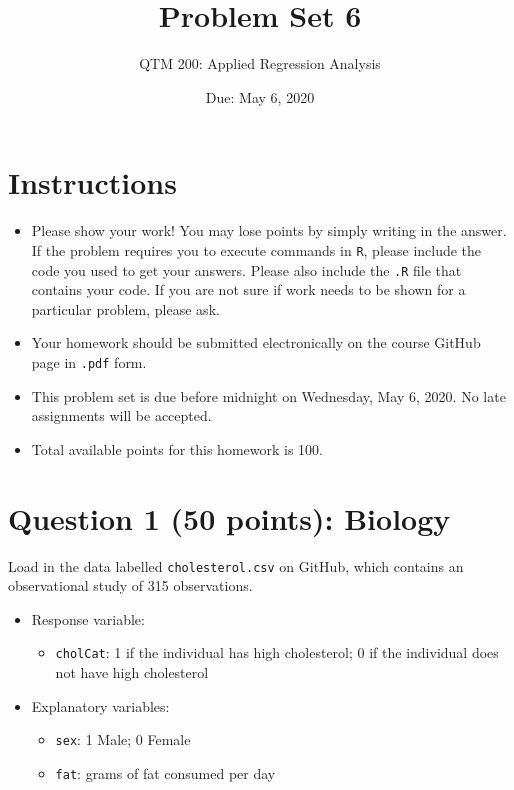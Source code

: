\documentclass[12pt,letterpaper]{article}
\title{Problem Set 6}
\date{Due: May 6, 2020}
\author{QTM 200: Applied Regression Analysis}
\begin{document}
	\maketitle
	
	\section*{Instructions}
	\begin{itemize}
		\item Please show your work! You may lose points by simply writing in the answer. If the problem requires you to execute commands in \texttt{R}, please include the code you used to get your answers. Please also include the \texttt{.R} file that contains your code. If you are not sure if work needs to be shown for a particular problem, please ask.
		\item Your homework should be submitted electronically on the course GitHub page in \texttt{.pdf} form.
		\item This problem set is due before midnight on Wednesday, May 6, 2020. No late assignments will be accepted.
		\item Total available points for this homework is 100.
	\end{itemize}
	
	\vspace{.5cm}
	\section*{Question 1 (50 points): Biology}
	\vspace{.25cm}
	\noindent Load in the data labelled \texttt{cholesterol.csv} on GitHub, which contains an observational study of 315 observations.
	
	\begin{itemize}
		\item
		Response variable: 
		\begin{itemize}
			\item \texttt{cholCat}: 1 if the individual has high cholesterol; 0 if the individual does not have high cholesterol
		\end{itemize}
		\item
		Explanatory variables: 
		\begin{itemize}
			\item
			\texttt{sex}: 1 Male; 0 Female
			\item
			\texttt{fat}: grams of fat consumed per day
			
		\end{itemize}
		
	\end{itemize}
	
\end{document}
